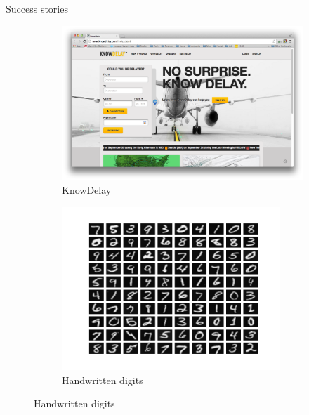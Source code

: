 \documentclass[10pt]{beamer}
\begin{document}
\begin{frame}{Success stories}
\begin{figure}
        \begin{subfigure}[b]{0.45\textwidth}
                \includegraphics[width=\textwidth]{images/delay.png}
                \caption{KnowDelay}                
        \end{subfigure}%
        \begin{subfigure}[b]{0.45\textwidth}
                \includegraphics[width=0.9\textwidth]{images/digits.png}
                \caption{Handwritten digits}
        \end{subfigure}
\end{figure}

\end{frame}
\end{document}
